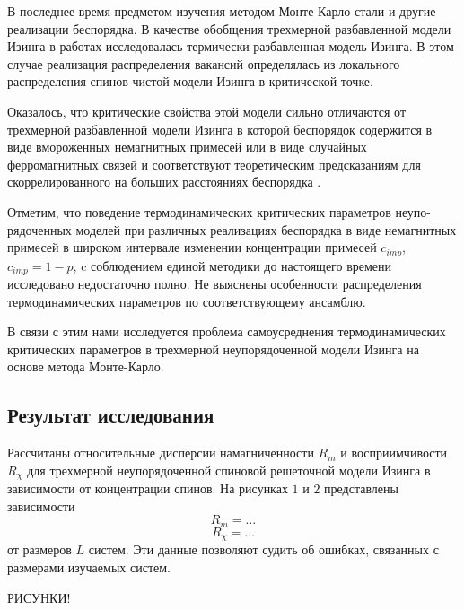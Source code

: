 В последнее время предметом изучения методом Монте-Карло стали и другие реализации беспорядка. В качестве обобщения трехмерной разбавленной модели Изинга в работах \cite{ph2_5,ph2_6} исследовалась термически разбавленная модель Изинга. В этом случае реализация распределения вакансий определялась из локального распределения спинов чистой модели Изинга в критической точке.

Оказалось, что критические свойства этой модели сильно отличаются от трехмерной разбавленной модели Изинга в которой беспорядок содержится в виде вмороженных немагнитных примесей или в виде случайных ферромагнитных связей и соответствуют теоретическим предсказаниям для скоррелированного на больших расстояниях беспорядка \cite{ph2_7}.

Отметим, что поведение термодинамических критических параметров неупо-рядоченных моделей при различных реализациях беспорядка в виде немагнитных примесей в широком интервале изменении концентрации примесей $c_{imp}$, $c_{imp}=1-p$, c соблюдением единой методики до настоящего времени исследовано недостаточно полно. Не выяснены особенности распределения термодинамических параметров по соответствующему ансамблю.

В связи с этим нами исследуется проблема самоусреднения термодинамических критических параметров в трехмерной неупорядоченной модели Изинга на основе метода Монте-Карло.






\subsection{Результат исследования}


Рассчитаны относительные дисперсии намагниченности  $R_m$ и восприимчивости $R_\chi$  для трехмерной неупорядоченной спиновой решеточной модели Изинга в зависимости от концентрации спинов.  На рисунках $1$ и $2$ представлены зависимости
\begin{equation*}
  R_m = \ldots
\end{equation*}
\begin{equation*}
  R_\chi = \ldots
\end{equation*}
от размеров $L$ систем. Эти данные позволяют судить об ошибках, связанных с размерами изучаемых систем.




\begin{LARGE}
  РИСУНКИ!
\end{LARGE}




